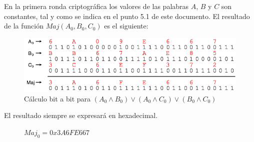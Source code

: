 \documentclass{article}
\begin{document}
        \vspace{3mm}
        En la primera ronda criptográfica los valores de las palabras $A$, $B$ y $C$ son constantes, tal y como se indica en el punto 5.1 de este documento. El resultado de la función $Maj(A_{0}, B_{0}, C_{0})$ es el siguiente:
            \begin{figure}[H]
            \centering
                \includegraphics[scale=0.41]{img/SHA-256-function_Maj.png}
                \caption{Cálculo bit a bit para $(A_{0} \land B_{0}) \lor (A_{0} \land C_{0}) \lor (B_{0} \land C_{0})$}
            \end{figure}
        El resultado siempre se expresará en hexadecimal.
            \begin{figure}[H]
            \centering
                $Maj_{0} = 0x3A6FE667$
            \end{figure}
        
\end{document}
